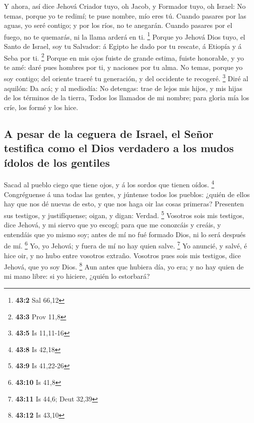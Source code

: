  Y ahora, así dice Jehová Criador tuyo, oh Jacob, y Formador
tuyo, oh Israel: No temas, porque yo te redimí; te puse nombre, mío eres
tú.  Cuando pasares por las aguas, yo seré contigo; y por
los ríos, no te anegarán. Cuando pasares por el fuego, no te quemarás,
ni la llama arderá en ti. \footnote{\textbf{43:2} Sal 66,12}
 Porque yo Jehová Dios tuyo, el Santo de Israel, soy tu
Salvador: á Egipto he dado por tu rescate, á Etiopía y á Seba por ti.
\footnote{\textbf{43:3} Prov 11,8}  Porque en mis ojos
fuiste de grande estima, fuiste honorable, y yo te amé: daré pues
hombres por ti, y naciones por tu alma.  No temas, porque yo
soy contigo; del oriente traeré tu generación, y del occidente te
recogeré. \footnote{\textbf{43:5} Is 11,11-16}  Diré al
aquilón: Da acá; y al mediodía: No detengas: trae de lejos mis hijos, y
mis hijas de los términos de la tierra,  Todos los llamados
de mi nombre; para gloria mía los críe, los formé y los hice.

\hypertarget{a-pesar-de-la-ceguera-de-israel-el-seuxf1or-testifica-como-el-dios-verdadero-a-los-mudos-uxeddolos-de-los-gentiles}{%
\subsection{A pesar de la ceguera de Israel, el Señor testifica como el
Dios verdadero a los mudos ídolos de los
gentiles}\label{a-pesar-de-la-ceguera-de-israel-el-seuxf1or-testifica-como-el-dios-verdadero-a-los-mudos-uxeddolos-de-los-gentiles}}

 Sacad al pueblo ciego que tiene ojos, y á los sordos que
tienen oídos. \footnote{\textbf{43:8} Is 42,18} 
Congréguense á una todas las gentes, y júntense todos los pueblos:
¿quién de ellos hay que nos dé nuevas de esto, y que nos haga oir las
cosas primeras? Presenten sus testigos, y justifíquense; oigan, y digan:
Verdad. \footnote{\textbf{43:9} Is 41,22-26}  Vosotros sois
mis testigos, dice Jehová, y mi siervo que yo escogí; para que me
conozcáis y creáis, y entendáis que yo mismo soy; antes de mí no fué
formado Dios, ni lo será después de mí. \footnote{\textbf{43:10} Is 41,8}
 Yo, yo Jehová; y fuera de mí no hay quien salve.
\footnote{\textbf{43:11} Is 44,6; Deut 32,39}  Yo anuncié,
y salvé, é hice oir, y no hubo entre vosotros extraño. Vosotros pues
sois mis testigos, dice Jehová, que yo soy Dios. \footnote{\textbf{43:12}
  Is 43,10}  Aun antes que hubiera día, yo era; y no hay
quien de mi mano libre: si yo hiciere, ¿quién lo estorbará?

